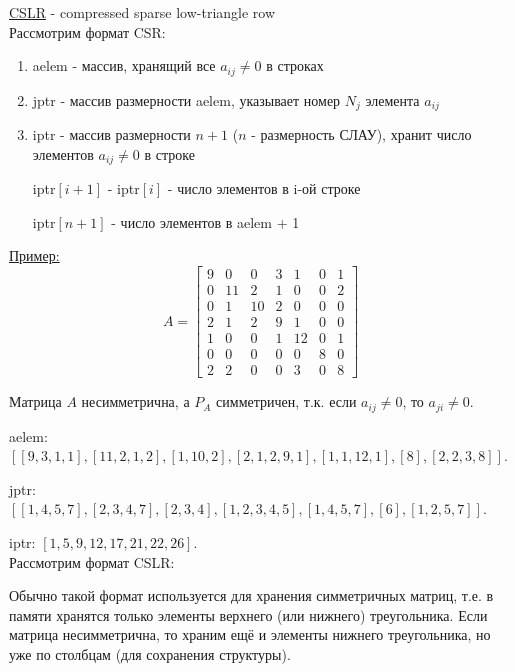 \underline{CSLR} - compressed sparse low-triangle row \\

Рассмотрим формат CSR:
\begin{enumerate}
	\item aelem - массив, хранящий все $a_{ij}\neq 0$ в строках
	\item jptr - массив размерности aelem, указывает номер $N_j$ элемента $a_{ij}$
	\item iptr - массив размерности $n+1$ ($n$ - размерность СЛАУ), хранит число элементов $a_{ij}\neq 0$ в строке
	
	iptr$[i+1]$ - iptr$[i]$ - число элементов в i-ой строке
	
	iptr$[n+1]$ - число элементов в aelem + 1
\end{enumerate}

\underline{Пример:}
\[
A=
\begin{bmatrix}
	9&0&0&3&1&0&1 \\
	0&11&2&1&0&0&2 \\
	0&1&10&2&0&0&0 \\
	2&1&2&9&1&0&0 \\
	1&0&0&1&12&0&1 \\
	0&0&0&0&0&8&0 \\
	2&2&0&0&3&0&8 
\end{bmatrix}
\]

Матрица $A$ несимметрична, а $P_A$ симметричен, т.к. если $a_{ij}\neq 0$, то $a_{ji}\neq 0$.

aelem: $\left[\left[ 9, 3, 1, 1 \right], \left[11, 2, 1, 2\right], \left[1, 10, 2\right],\left[2, 1, 2 ,9, 1\right],\left[1, 1, 12, 1\right],\left[8\right],\left[2, 2, 3, 8\right] \right]$.

jptr: $\left[\left[1, 4, 5, 7\right], \left[2, 3, 4, 7\right], \left[2, 3, 4\right],\left[1, 2, 3, 4, 5\right],\left[1, 4, 5, 7 \right],\left[6\right],\left[1, 2, 5, 7\right] \right]$.

iptr: $\left[1, 5, 9, 12, 17, 21, 22, 26\right]$. \\

Рассмотрим формат CSLR:

Обычно такой формат используется для хранения симметричных матриц, т.е. в памяти хранятся только элементы верхнего (или нижнего) треугольника.
Если матрица несимметрична, то храним ещё и элементы нижнего треугольника, но уже по столбцам (для сохранения структуры).

